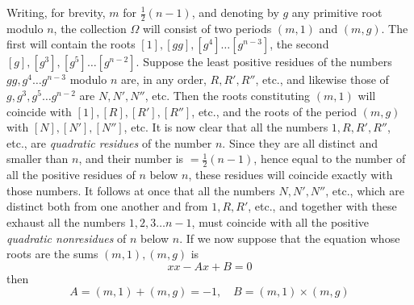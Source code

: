 Writing, for brevity, \(m\) for \(\frac12(n-1)\), and denoting by \(g\) any primitive root modulo \(n\), the collection \(\Omega\) will consist of two periods \((m,1)\) and \((m,g)\). The first will contain the roots \([1],\allowbreak [gg],\allowbreak [g^4]\ldots[g^{n-3}]\), the second \([g],\allowbreak [g^3],\allowbreak [g^5]\ldots[g^{n-2}]\). Suppose the least positive residues of the numbers \(gg,\allowbreak g^4\ldots g^{n-3}\) modulo \(n\) are, in any order, \(R,\allowbreak R',\allowbreak R''\), etc., and likewise those of \(g,\allowbreak g^3,\allowbreak g^5\ldots g^{n-2}\) are \(N,\allowbreak N',\allowbreak N''\), etc. Then the roots constituting \((m,1)\) will coincide with \([1],\allowbreak [R],\allowbreak [R'],\allowbreak [R'']\), etc., and the roots of the period \((m,g)\) with \([N],\allowbreak [N'],\allowbreak [N'']\), etc. It is now clear that all the numbers \(1,\allowbreak R,\allowbreak R',\allowbreak R''\), etc., are \textit{quadratic residues} of the number \(n\). Since they are all distinct and smaller than \(n\), and their number is \(=\frac12(n-1)\), hence equal to the number of all the positive residues of \(n\) below \(n\), these residues will coincide exactly with those numbers. It follows at once that all the numbers \(N,\allowbreak N',\allowbreak N''\), etc., which are distinct both from one another and from \(1,\allowbreak R,\allowbreak R'\), etc., and together with these exhaust all the numbers \(1,\allowbreak 2,\allowbreak 3\ldots n-1\), must coincide with all the positive \textit{quadratic nonresidues} of \(n\) below \(n\). If we now suppose that the equation whose roots are the sums \((m,1),\allowbreak (m,g)\) is \[xx-Ax+B=0\] then \[A=(m,1)+(m,g)=-1,\quad B=(m,1)\times(m,g)\]

